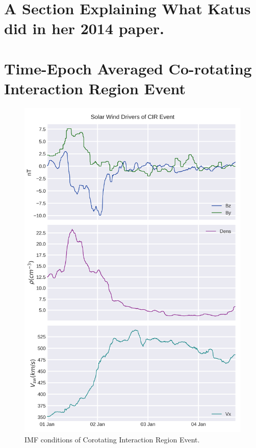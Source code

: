 \documentclass[utf8]{report}
\begin{document}
\section{A Section Explaining What Katus did in her 2014 paper.}
\section{Time-Epoch Averaged Co-rotating Interaction Region Event}

\begin{figure}[!ht]
\begin{center}
\includegraphics{Ideal_CIR.png} 
\caption{IMF conditions of Corotating Interaction Region Event.}
\label{fig:2}
\end{center}
\end{figure}
\end{document}
